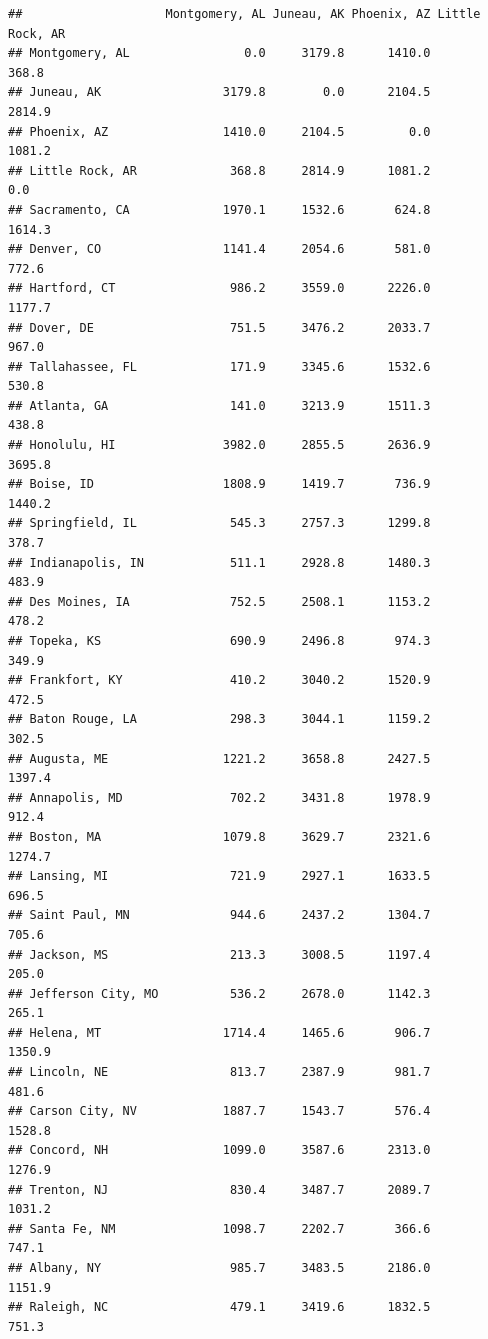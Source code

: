 \documentclass[
]{article}
\begin{document}
\begin{verbatim}
##                    Montgomery, AL Juneau, AK Phoenix, AZ Little Rock, AR
## Montgomery, AL                0.0     3179.8      1410.0           368.8
## Juneau, AK                 3179.8        0.0      2104.5          2814.9
## Phoenix, AZ                1410.0     2104.5         0.0          1081.2
## Little Rock, AR             368.8     2814.9      1081.2             0.0
## Sacramento, CA             1970.1     1532.6       624.8          1614.3
## Denver, CO                 1141.4     2054.6       581.0           772.6
## Hartford, CT                986.2     3559.0      2226.0          1177.7
## Dover, DE                   751.5     3476.2      2033.7           967.0
## Tallahassee, FL             171.9     3345.6      1532.6           530.8
## Atlanta, GA                 141.0     3213.9      1511.3           438.8
## Honolulu, HI               3982.0     2855.5      2636.9          3695.8
## Boise, ID                  1808.9     1419.7       736.9          1440.2
## Springfield, IL             545.3     2757.3      1299.8           378.7
## Indianapolis, IN            511.1     2928.8      1480.3           483.9
## Des Moines, IA              752.5     2508.1      1153.2           478.2
## Topeka, KS                  690.9     2496.8       974.3           349.9
## Frankfort, KY               410.2     3040.2      1520.9           472.5
## Baton Rouge, LA             298.3     3044.1      1159.2           302.5
## Augusta, ME                1221.2     3658.8      2427.5          1397.4
## Annapolis, MD               702.2     3431.8      1978.9           912.4
## Boston, MA                 1079.8     3629.7      2321.6          1274.7
## Lansing, MI                 721.9     2927.1      1633.5           696.5
## Saint Paul, MN              944.6     2437.2      1304.7           705.6
## Jackson, MS                 213.3     3008.5      1197.4           205.0
## Jefferson City, MO          536.2     2678.0      1142.3           265.1
## Helena, MT                 1714.4     1465.6       906.7          1350.9
## Lincoln, NE                 813.7     2387.9       981.7           481.6
## Carson City, NV            1887.7     1543.7       576.4          1528.8
## Concord, NH                1099.0     3587.6      2313.0          1276.9
## Trenton, NJ                 830.4     3487.7      2089.7          1031.2
## Santa Fe, NM               1098.7     2202.7       366.6           747.1
## Albany, NY                  985.7     3483.5      2186.0          1151.9
## Raleigh, NC                 479.1     3419.6      1832.5           751.3

\end{verbatim}
\end{document}

